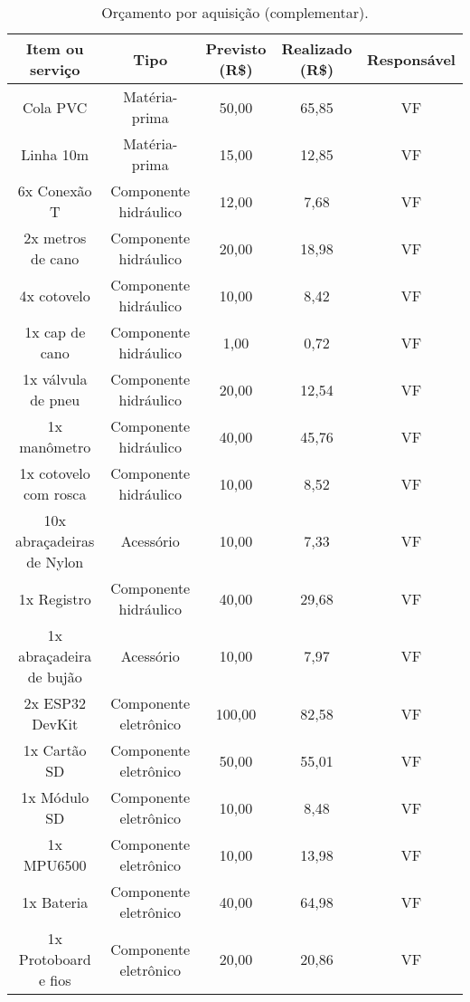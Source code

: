 \begin{landscape}
\begin{table}[htpb]
\centering
\caption{Orçamento por aquisição (complementar).}
\small
\begin{tabular}{|c|c|c|c|c|}
\hline
\textbf{Item ou serviço} & \textbf{Tipo} & \textbf{Previsto (R\$)} & \textbf{Realizado (R\$)} & \textbf{Responsável} \\ \hline
Cola PVC & Matéria-prima & 50,00 & 65,85 & VF \\ \hline
Linha 10m & Matéria-prima & 15,00 & 12,85 & VF \\ \hline
6x Conexão T & Componente hidráulico & 12,00 & 7,68 & VF \\ \hline
2x metros de cano & Componente hidráulico & 20,00 & 18,98 & VF \\ \hline
4x cotovelo & Componente hidráulico & 10,00 & 8,42 & VF \\ \hline
1x cap de cano & Componente hidráulico & 1,00 & 0,72 & VF \\ \hline
1x válvula de pneu & Componente hidráulico & 20,00 & 12,54 & VF \\ \hline
1x manômetro & Componente hidráulico & 40,00 & 45,76 & VF \\ \hline
1x cotovelo com rosca & Componente hidráulico & 10,00 & 8,52 & VF \\ \hline
10x abraçadeiras de Nylon & Acessório & 10,00 & 7,33 & VF \\ \hline
1x Registro & Componente hidráulico & 40,00 & 29,68 & VF \\ \hline
1x abraçadeira de bujão & Acessório & 10,00 & 7,97 & VF \\ \hline
2x ESP32 DevKit & Componente eletrônico & 100,00 & 82,58 & VF \\ \hline
1x Cartão SD & Componente eletrônico & 50,00 & 55,01 & VF \\ \hline
1x Módulo SD & Componente eletrônico & 10,00 & 8,48 & VF \\ \hline
1x MPU6500 & Componente eletrônico & 10,00 & 13,98 & VF \\ \hline
1x Bateria & Componente eletrônico & 40,00 & 64,98 & VF \\ \hline
1x Protoboard e fios & Componente eletrônico & 20,00 & 20,86 & VF \\ \hline
\end{tabular}
\end{table}

\end{landscape}
